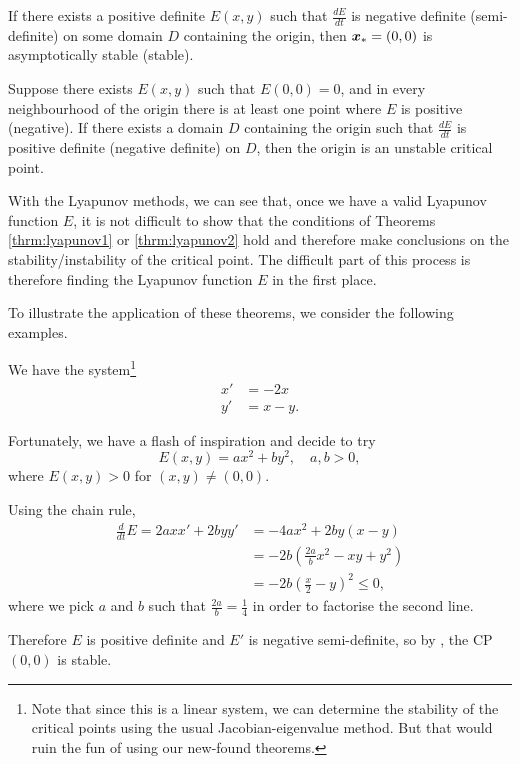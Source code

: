 \begin{theorem}\label{thrm:lyapunov1}
	If there exists a positive definite $E(x,y)$ such that $\frac{dE}{dt}$ is negative definite (semi-definite) on some domain $D$ containing the origin, then $\bm{x}_{\ast} = (0,0)$ is asymptotically stable (stable).
\end{theorem}

\begin{theorem}\label{thrm:lyapunov2}
	Suppose there exists $E(x,y)$ such that $E(0,0)=0$, and in every neighbourhood of the origin there is at least one point where $E$ is positive (negative). If there exists a domain $D$ containing the origin such that $\frac{dE}{dt}$ is positive definite (negative definite) on $D$, then the origin is an unstable critical point.
\end{theorem}

With the Lyapunov methods, we can see that, once we have a valid Lyapunov function $E$, it is not difficult to show that the conditions of Theorems \ref{thrm:lyapunov1} or \ref{thrm:lyapunov2} hold and therefore make conclusions on the stability/instability of the critical point. The difficult part of this process is therefore finding the Lyapunov function $E$ in the first place.

To illustrate the application of these theorems, we consider the following examples.

\begin{eg}
	We have the system\footnote{Note that since this is a linear system, we can determine the stability of the critical points using the usual Jacobian-eigenvalue method. But that would ruin the fun of using our new-found theorems.}
	\begin{align*}
		x' &= -2x \\
		y' &= x-y.
	\end{align*}
	
	Fortunately, we have a flash of inspiration and decide to try
	\[
	E(x,y) = ax^2 + by^2, \quad a,b>0,
	\]
	where $E(x,y)>0$ for $(x,y)\neq(0,0)$.
	
	Using the chain rule,
	\begin{align*}
		\frac{d}{dt}E = 2axx' + 2byy' &= -4ax^2 + 2by(x-y) \\
		&= -2b\left(\frac{2a}{b}x^2 - xy + y^2\right) \\
		&= -2b\left(\frac{x}{2} - y\right)^2 \leq 0,
	\end{align*}
	where we pick $a$ and $b$ such that $\frac{2a}{b} = \frac14$ in order to factorise the second line.
	
	Therefore $E$ is positive definite and $E'$ is negative semi-definite, so by , the CP $(0,0)$ is stable.
\end{eg}

